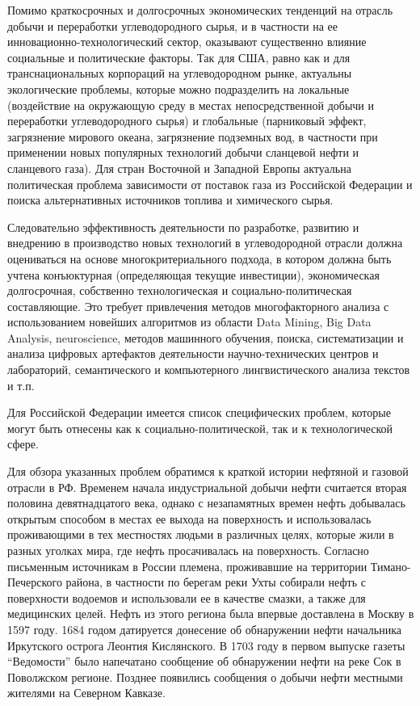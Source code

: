 Помимо краткосрочных и долгосрочных экономических тенденций на отрасль добычи и переработки углеводородного сырья, и в частности на ее инновационно-технологический сектор, оказывают существенно влияние социальные и политические факторы.
Так для США, равно как и для транснациональных корпораций на углеводородном рынке, актуальны экологические проблемы, которые можно подразделить на локальные (воздействие на окружающую среду в местах непосредственной добычи и переработки углеводородного сырья) и глобальные (парниковый эффект, загрязнение мирового океана, загрязнение подземных вод, в частности при применении новых популярных технологий добычи сланцевой нефти и сланцевого газа).
Для стран Восточной и Западной Европы актуальна политическая проблема зависимости от поставок газа из Российской Федерации и поиска альтернативных источников топлива и химического сырья.

Следовательно эффективность деятельности по разработке, развитию и внедрению в производство новых технологий в углеводородной отрасли должна оцениваться на основе многокритериального подхода, в котором должна быть учтена конъюктурная (определяющая текущие инвестиции), экономическая долгосрочная, собственно технологическая и социально-политическая составляющие.
Это требует привлечения методов многофакторного анализа с использованием новейших алгоритмов из области Data Mining, Big Data Analysis, neuroscience, методов машинного обучения, поиска, систематизации и анализа цифровых артефактов деятельности научно-технических центров и лабораторий, семантического и компьютерного лингвистического анализа текстов и т.п.

Для Российской Федерации имеется список специфических проблем, которые могут быть отнесены как к социально-политической, так и к технологической сфере.

Для обзора указанных проблем обратимся к краткой истории нефтяной и газовой отрасли в РФ.
Временем начала индустриальной добычи нефти считается вторая половина девятнадцатого века, однако с незапамятных времен нефть добывалась открытым способом в местах ее выхода на поверхность и использовалась проживающими в тех местностях людьми в различных целях, которые жили в разных уголках мира, где нефть просачивалась на поверхность.
Согласно письменным источникам в России племена, проживавшие на территории Тимано-Печерского района, в частности по берегам реки Ухты собирали нефть с поверхности водоемов и использовали ее в качестве смазки, а также для медицинских целей.
Нефть из этого региона была впервые доставлена в Москву в 1597 году.
1684 годом датируется донесение об обнаружении нефти начальника Иркутского острога Леонтия Кислянского.
В 1703 году в первом выпуске газеты ``Ведомости'' было напечатано сообщение об обнаружении нефти на реке Сок в Поволжском регионе.
Позднее появились сообщения о добычи нефти местными жителями на Северном Кавказе.

